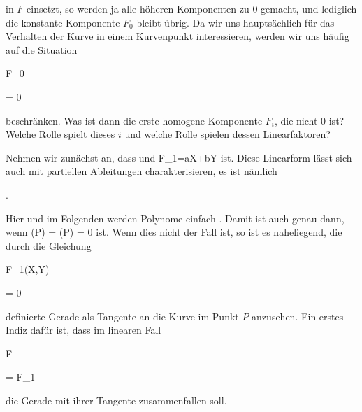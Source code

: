  in $F$ einsetzt, so  werden ja alle höheren Komponenten zu $0$ gemacht, und lediglich die konstante Komponente $F_0$ bleibt übrig. Da wir uns hauptsächlich für das Verhalten der Kurve in einem Kurvenpunkt interessieren, werden wir uns häufig auf die Situation


\mavergleichskette

{\vergleichskette

{ F_0
}

{ = }{ 0
}

{  }{
}

{    }{
}

{   }{
}

}
{}{}{}
beschränken. Was ist dann die erste homogene Komponente $F_i$, die nicht $0$ ist? Welche Rolle spielt dieses $i$ und welche Rolle spielen dessen Linearfaktoren?


Nehmen wir zunächst an, dass   {  und  }  { F_1=aX+bY  }{ } ist. Diese Linearform
 {} {}
lässt sich auch mit partiellen Ableitungen charakterisieren, es ist nämlich


 { . }


Hier und im Folgenden werden Polynome einfach  {.} Damit ist auch   {  genau dann, wenn  }  { {  } (P) = {  } (P) = 0   }{ }
ist. Wenn dies nicht der Fall ist, so ist es naheliegend, die durch die Gleichung


\mavergleichskette

{\vergleichskette

{ F_1(X,Y)
}

{ = }{ 0
}

{  }{
}

{    }{
}

{   }{
}

}
{}{}{}
definierte Gerade als Tangente an die Kurve im Punkt $P$ anzusehen. Ein erstes Indiz dafür ist, dass im linearen Fall


\mavergleichskette

{\vergleichskette

{F
}

{ = }{F_1
}

{  }{
}

{    }{
}

{   }{
}

}
{}{}{}
die Gerade mit ihrer Tangente zusammenfallen soll.



